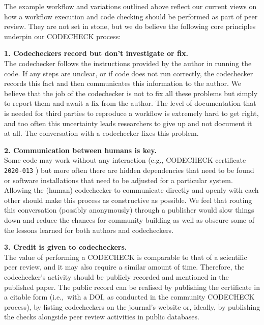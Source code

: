 \documentclass[12pt]{article}
\begin{document}
The example workflow and variations outlined above reflect our current
views on how a workflow execution and code checking should be performed as part of peer review.
They are not set in stone, but we do believe the following core principles underpin our CODECHECK process:

\textbf{1. Codecheckers record but don't investigate or fix.} \\
The codechecker follows the instructions provided by the author in running
the code. If any steps are unclear, or if code does not run correctly,
the codechecker records this fact and then communicates this
information to the author. We believe that the job of the codechecker is
not to fix all these problems but simply to report them and await a
fix from the author.
The level of documentation that is needed for third parties
to reproduce a workflow is extremely hard to get right, and too often this 
uncertainty leads researchers to give up and not document it at all.
The conversation with a codechecker fixes this problem.

\textbf{2. Communication between humans is key.} \\ 
Some code may
work without any interaction (e.g., CODECHECK certificate \texttt{2020-013}
\cite{cert-2020-013}) but more often there are hidden
dependencies that need to be found or software installations that need to be adjusted for a particular system.
Allowing the (human) codechecker to communicate
directly and openly with each other should make this process as
constructive as possible. We feel that routing this conversation
(possibly anonymously) through a publisher would slow things down and
reduce the chances for community building as well as obscure some of the lessons
learned for both authors and codecheckers.

\textbf{3. Credit is given to codecheckers.} \\ 
The value of performing a
CODECHECK is comparable to that of a scientific peer review, and
it may also require a similar amount of time. Therefore,
the codechecker's activity should be publicly recorded and mentioned in the
published paper.
The public record can be realised by publishing the certificate in a 
citable form (i.e.,~with a DOI, as conducted in the community CODECHECK
process), by listing codecheckers on the journal's website or, ideally, by
publishing the checks alongside peer review activities in public databases.
\end{document}
